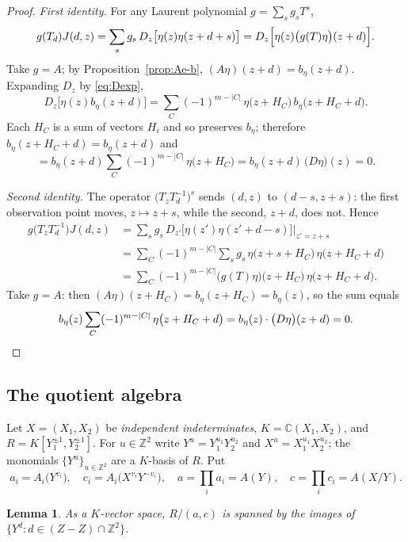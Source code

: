 \documentclass[11pt,reqno]{amsart}
\theoremstyle{plain}
\newtheorem{lem}[thm]{Lemma}
\theoremstyle{definition}
\theoremstyle{remark}
\theoremstyle{plain}
\theoremstyle{remark}
\theoremstyle{definition}
\numberwithin{equation}{section}
\newcommand{\Z}{\mathbb{Z}}
\newcommand{\C}{\mathbb{C}}
\begin{document}
\begin{proof}
\emph{First identity.}  For any Laurent polynomial $g=\sum_sg_sT^s$,
\[g(T_d)J(d,z)=\sum_sg_s\,D_z\bigl[\eta(z)\eta(z+d+s)\bigr]
             =D_z\Bigl[\eta(z)\bigl(g(T)\eta\bigr)(z+d)\Bigr].\]
Take $g=A$; by Proposition~\ref{prop:Ae-b}, $(A\eta)(z+d)=b_\eta(z+d)$.
Expanding $D_z$ by \eqref{eq:Dexp},
\[D_z\bigl[\eta(z)b_\eta(z+d)\bigr]
  =\sum_C(-1)^{m-|C|}\,\eta\bigl(z+H_C\bigr)\,b_\eta\bigl(z+H_C+d\bigr).\]
Each $H_C$ is a sum of vectors $H_i$ and so preserves $b_\eta$; therefore
$b_\eta(z+H_C+d)=b_\eta(z+d)$ and
\[=b_\eta(z+d)\sum_C(-1)^{m-|C|}\,\eta\bigl(z+H_C\bigr)
  =b_\eta(z+d)\,\bigl(D\eta\bigr)(z)=0 .\]

\emph{Second identity.}  The operator $\bigl(T_zT_d^{-1}\bigr)^s$ sends $(d,z)$
to $(d-s,z+s)$: the first observation point moves, $z\mapsto z+s$, while the
second, $z+d$, does not.  Hence
\begin{align*}
g\bigl(T_zT_d^{-1}\bigr)J(d,z)
 &=\sum_sg_s\,D_{z'}\bigl[\eta(z')\eta(z'+d-s)\bigr]\Big|_{z'=z+s}\\
 &=\sum_C(-1)^{m-|C|}\sum_sg_s\,\eta\bigl(z+s+H_C\bigr)\,
    \eta\bigl(z+H_C+d\bigr)\\
 &=\sum_C(-1)^{m-|C|}\bigl(g(T)\eta\bigr)\bigl(z+H_C\bigr)\,
    \eta\bigl(z+H_C+d\bigr).
\end{align*}
Take $g=A$: then $(A\eta)(z+H_C)=b_\eta(z+H_C)=b_\eta(z)$, so the sum equals
\[b_\eta(z)\sum_C(-1)^{m-|C|}\,\eta\bigl(z+H_C+d\bigr)
 =b_\eta(z)\cdot\bigl(D\eta\bigr)(z+d)=0 .\qedhere\]
\end{proof}

\subsection{The quotient algebra}\label{ssec:quotient}

Let $X=(X_1,X_2)$ be \emph{independent indeterminates}, $K=\C(X_1,X_2)$, and
$R=K[Y_1^{\pm1},Y_2^{\pm1}]$.  For $u\in\Z^2$ write $Y^u=Y_1^{u_1}Y_2^{u_2}$ and
$X^u=X_1^{u_1}X_2^{u_2}$; the monomials $\{Y^u\}_{u\in\Z^2}$ are a $K$-basis of
$R$.  Put
\[a_i=A_i\bigl(Y^{v_i}\bigr),\quad c_i=A_i\bigl(X^{v_i}Y^{-v_i}\bigr),\quad
  a=\prod_ia_i=A(Y),\quad c=\prod_ic_i=A(X/Y).\]

\begin{lem}\label{lem:quotient}
As a $K$-vector space, $R/(a,c)$ is spanned by the images of
$\{Y^d:d\in(Z-Z)\cap\Z^2\}$.
\end{lem}
\end{document}
